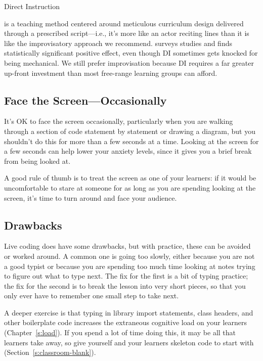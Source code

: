 \begin{aside}{Direct Instruction}

 is a teaching
method centered around meticulous curriculum design delivered through
a prescribed script---i.e., it's more like an actor reciting lines than
it is like the improvisatory approach we recommend. \cite{Stoc2018}
surveys studies and finds statistically significant positive effect,
even though DI sometimes gets knocked for being mechanical. We still
prefer improvisation because DI requires a far greater up-front
investment than most free-range learning groups can afford.

\end{aside}

\subsection*{Face the Screen---Occasionally}

It's OK to face the screen occasionally, particularly when you are
walking through a section of code statement by statement or drawing a
diagram, but you shouldn't do this for more than a few seconds at a
time. Looking at the screen for a few seconds can help lower your
anxiety levels, since it gives you a brief break from being looked at.

A good rule of thumb is to treat the screen as one of your learners: if
it would be uncomfortable to stare at someone for as long as you are
spending looking at the screen, it's time to turn around and face your
audience.

\subsection*{Drawbacks}

Live coding does have some drawbacks, but with practice, these can be
avoided or worked around. A common one is going too slowly, either
because you are not a good typist or because you are spending too much
time looking at notes trying to figure out what to type next. The fix
for the first is a bit of typing practice; the fix for the second is to
break the lesson into very short pieces, so that you only ever have to
remember one small step to take next.

A deeper exercise is that typing in library import statements, class
headers, and other boilerplate code increases the extraneous cognitive
load on your learners (Chapter~\ref{s:load}). If you spend a lot of time
doing this, it may be all that learners take away, so give yourself and
your learners skeleton code to start with
(Section~\ref{s:classroom-blank}).

